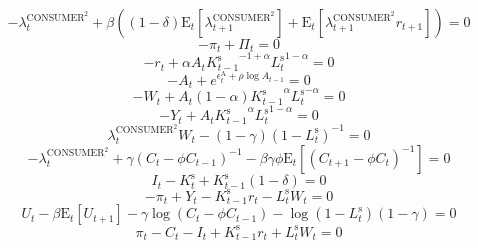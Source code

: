 \begin{equation}
-\lambda^{\mathrm{CONSUMER}^{\mathrm{2}}}_{t} + {\beta} \left(\left(1 - \delta\right) {\mathrm{E}_{t}\left[\lambda^{\mathrm{CONSUMER}^{\mathrm{2}}}_{t+1}\right]} + \mathrm{E}_{t}\left[{\lambda^{\mathrm{CONSUMER}^{\mathrm{2}}}_{t+1}} {r_{t+1}}\right]\right) = 0
\end{equation}
\begin{equation}
-\pi_{t} + \Pi_{t} = 0
\end{equation}
\begin{equation}
-r_{t} + {\alpha} {A_{t}} {{K^{\mathrm{s}}_{t-1}}^{-1 + \alpha}} {{L^{\mathrm{s}}_{t}}^{1 - \alpha}} = 0
\end{equation}
\begin{equation}
-A_{t} + e^{\epsilon^{\mathrm{A}}_{t} + {\rho} {\log{A_{t-1}}}} = 0
\end{equation}
\begin{equation}
-W_{t} + {A_{t}} \left(1 - \alpha\right) {{K^{\mathrm{s}}_{t-1}}^{\alpha}} {{L^{\mathrm{s}}_{t}}^{-\alpha}} = 0
\end{equation}
\begin{equation}
-Y_{t} + {A_{t}} {{K^{\mathrm{s}}_{t-1}}^{\alpha}} {{L^{\mathrm{s}}_{t}}^{1 - \alpha}} = 0
\end{equation}
\begin{equation}
{\lambda^{\mathrm{CONSUMER}^{\mathrm{2}}}_{t}} {W_{t}} - \left(1 - \gamma\right) \left(1 - L^{\mathrm{s}}_{t}\right)^{-1} = 0
\end{equation}
\begin{equation}
-\lambda^{\mathrm{CONSUMER}^{\mathrm{2}}}_{t} + {\gamma} \left(C_{t} - {\phi} {C_{t-1}}\right)^{-1} - {\beta} {\gamma} {\phi} {\mathrm{E}_{t}\left[\left(C_{t+1} - {\phi} {C_{t}}\right)^{-1}\right]} = 0
\end{equation}
\begin{equation}
I_{t} - K^{\mathrm{s}}_{t} + {K^{\mathrm{s}}_{t-1}} \left(1 - \delta\right) = 0
\end{equation}
\begin{equation}
-\pi_{t} + Y_{t} - {K^{\mathrm{s}}_{t-1}} {r_{t}} - {L^{\mathrm{s}}_{t}} {W_{t}} = 0
\end{equation}
\begin{equation}
U_{t} - {\beta} {\mathrm{E}_{t}\left[U_{t+1}\right]} - {\gamma} {\log\left(C_{t} - {\phi} {C_{t-1}}\right)} - {\log\left(1 - L^{\mathrm{s}}_{t}\right)} \left(1 - \gamma\right) = 0
\end{equation}
\begin{equation}
\pi_{t} - C_{t} - I_{t} + {K^{\mathrm{s}}_{t-1}} {r_{t}} + {L^{\mathrm{s}}_{t}} {W_{t}} = 0
\end{equation}



